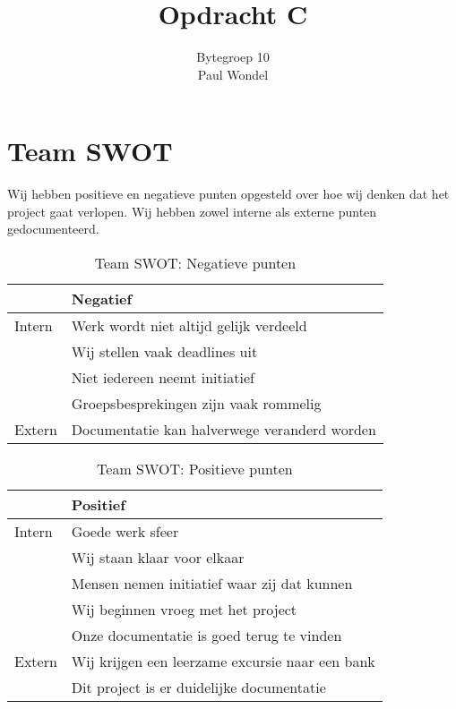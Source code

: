 \documentclass{article}
\title{Opdracht C}
\author{Bytegroep 10\\
	Paul Wondel}
\begin{document}
\maketitle
\newpage

\tableofcontents

\newpage

\section{Team SWOT}

Wij hebben positieve en negatieve punten opgesteld over hoe wij denken dat het project gaat verlopen.
Wij hebben zowel interne als externe punten gedocumenteerd.

\vspace{5mm}

\begin{table}[h!]
\caption{Team SWOT: Negatieve punten}
\label{tab: Negatieve punten}
\begin{tabular}{l|l}
        & \textbf{Negatief}\\
        \hline
        {Intern} 	& Werk wordt niet altijd gelijk verdeeld \\
			& Wij stellen vaak deadlines uit \\
			& Niet iedereen neemt initiatief \\
			& Groepsbesprekingen zijn vaak rommelig \\
	\hline
        {Extern}	& Documentatie kan halverwege veranderd worden\\
\end{tabular}
\end{table}

\begin{table}[h!]
\caption{Team SWOT: Positieve punten}
\label{tab: Positieve punten}
\begin{tabular}{l|l}
        & \textbf{Positief} \\
        \hline
        {Intern} 	& Goede werk sfeer \\ 
			& Wij staan klaar voor elkaar \\
			& Mensen nemen initiatief waar zij dat kunnen \\
			& Wij beginnen vroeg met het project \\
			& Onze documentatie is goed terug te vinden \\
	\hline
        {Extern}	& Wij krijgen een leerzame excursie naar een bank \\
			& Dit project is er duidelijke documentatie \\	
\end{tabular}
\end{table}
\end{document}
